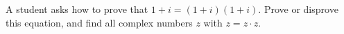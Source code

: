 A student asks how to prove that $1+i=(1+i)(1+i)$. Prove or disprove this equation, and find all complex numbers $z$ with $z=z\cdot z$.
